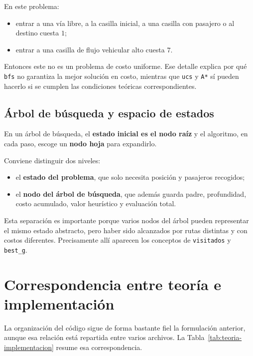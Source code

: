 \documentclass[12pt,a4paper]{article}
\begin{document}
En este problema:
\begin{itemize}
    \item entrar a una vía libre, a la casilla inicial, a una casilla con pasajero o al destino cuesta \(1\);
    \item entrar a una casilla de flujo vehicular alto cuesta \(7\).
\end{itemize}

Entonces este no es un problema de costo uniforme. Ese detalle explica por qué \texttt{bfs} no garantiza la mejor solución en costo, mientras que \texttt{ucs} y \texttt{A*} sí pueden hacerlo si se cumplen las condiciones teóricas correspondientes.

\subsection{Árbol de búsqueda y espacio de estados}
En un árbol de búsqueda, el \textbf{estado inicial es el nodo raíz} y el algoritmo, en cada paso, escoge un \textbf{nodo hoja} para expandirlo.

Conviene distinguir dos niveles:
\begin{itemize}
    \item el \textbf{estado del problema}, que solo necesita posición y pasajeros recogidos;
    \item el \textbf{nodo del árbol de búsqueda}, que además guarda padre, profundidad, costo acumulado, valor heurístico y evaluación total.
\end{itemize}

Esta separación es importante porque varios nodos del árbol pueden representar el mismo estado abstracto, pero haber sido alcanzados por rutas distintas y con costos diferentes. Precisamente allí aparecen los conceptos de \texttt{visitados} y \texttt{best\_g}.

\section{Correspondencia entre teoría e implementación}
La organización del código sigue de forma bastante fiel la formulación anterior, aunque esa relación está repartida entre varios archivos. La Tabla~\ref{tab:teoria-implementacion} resume esa correspondencia.
\end{document}
